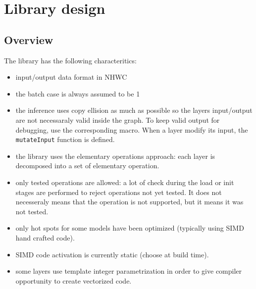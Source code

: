 \documentclass[10pt,a4paper]{article}
\begin{document}
\section{Library design}
\subsection{Overview}
The library has the following characteritics:
\begin{itemize}
\item input/output data format in NHWC
\item the batch case is always assumed to be 1
\item the inference uses copy ellision as much as possible so the layers input/output are not necessaraly valid inside the graph. To keep valid output for debugging, use the corresponding macro. When a layer modify its input, the \texttt{mutateInput} function is defined.
\item the library uses the elementary operations approach: each layer is decomposed into a set of elementary operation.
\item only tested operations are allowed: a lot of check during the load or init stages are performed to reject operations not yet tested. It does not necesseraly means that the operation is not supported, but it means it was not tested.
\item only hot spots for some models have been optimized (typically using SIMD hand crafted code). 
\item SIMD code activation is currently static (choose at build time).
\item some layers use template integer parametrization in order to give compiler opportunity to create vectorized code.
\end{itemize}
\end{document}
